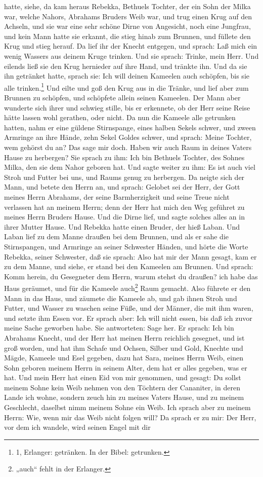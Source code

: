 hatte, siehe, da kam heraus Rebekka, Bethuels Tochter, der ein Sohn der Milka war, welche Nahors, Abrahams Bruders Weib war, und trug einen Krug auf den Achseln, und sie war eine sehr schöne Dirne von Angesicht, noch eine Jungfrau, und kein Mann hatte sie erkannt, die stieg hinab zum Brunnen, und füllete den Krug und stieg herauf. Da lief ihr der Knecht entgegen, und sprach: Laß mich ein wenig Wassers aus deinem Kruge trinken. Und sie sprach: Trinke, mein Herr. Und eilends ließ sie den Krug hernieder auf ihre Hand, und tränkte ihn. Und da sie ihn getränket hatte, sprach sie: Ich will deinen Kameelen auch schöpfen, bis sie alle trinken.\footnote{1, Erlanger: getränken. In der Bibel: getrunken.} Und eilte und goß den Krug aus in die Tränke, und lief aber zum Brunnen zu schöpfen, und schöpfete allein seinen Kameelen. Der Mann aber wunderte sich ihrer und schwieg stille, bis er erkennete, ob der Herr seine Reise hätte lassen wohl gerathen, oder nicht. Da nun die Kameele alle getrunken hatten, nahm er eine güldene Stirnspange, eines halben Sekels schwer, und zween Armringe an ihre Hände, zehn Sekel Goldes schwer, und sprach: Meine Tochter, wem gehörst du an? Das sage mir doch. Haben wir auch Raum in deines Vaters Hause zu herbergen? Sie sprach zu ihm: Ich bin Bethuels Tochter, des Sohnes Milka, den sie dem Nahor geboren hat. Und sagte weiter zu ihm: Es ist auch viel Stroh und Futter bei uns, und Raums genug zu herbergen. Da neigte sich der Mann, und betete den Herrn an, und sprach: Gelobet sei der Herr, der Gott meines Herrn Abrahams, der seine Barmherzigkeit und seine Treue nicht verlassen hat an meinem Herrn; denn der Herr hat mich den Weg geführet zu meines Herrn Bruders Hause. Und die Dirne lief, und sagte solches alles an in ihrer Mutter Hause. Und Rebekka hatte einen Bruder, der hieß Laban. Und Laban lief zu dem Manne draußen bei dem Brunnen, und als er sahe die Stirnspangen, und Armringe an seiner Schwester Händen, und hörte die Worte Rebekka, seiner Schwester, daß sie sprach: Also hat mir der Mann gesagt, kam er zu dem Manne, und siehe, er stand bei den Kameelen am Brunnen. Und sprach: Komm herein, du Gesegneter dem Herrn, warum stehst du draußen? ich habe das Haus geräumet, und für die Kameele auch\footnote{„auch“ fehlt in der Erlanger.} Raum gemacht. Also führete er den Mann in das Haus, und zäumete die Kameele ab, und gab ihnen Stroh und Futter, und Wasser zu waschen seine Füße, und der Männer, die mit ihm waren, und setzte ihm Essen vor. Er sprach aber: Ich will nicht essen, bis daß ich zuvor meine Sache geworben habe. Sie antworteten: Sage her. Er sprach: Ich bin Abrahams Knecht, und der Herr hat meinen Herrn reichlich gesegnet, und ist groß worden, und hat ihm Schafe und Ochsen, Silber und Gold, Knechte und Mägde, Kameele und Esel gegeben, dazu hat Sara, meines Herrn Weib, einen Sohn geboren meinem Herrn in seinem Alter, dem hat er alles gegeben, was er hat. Und mein Herr hat einen Eid von mir genommen, und gesagt: Du sollst meinem Sohne kein Weib nehmen von den Töchtern der Cananiter, in deren Lande ich wohne, sondern zeuch hin zu meines Vaters Hause, und zu meinem Geschlecht, daselbst nimm meinem Sohne ein Weib. Ich sprach aber zu meinem Herrn: Wie, wenn mir das Weib nicht folgen will? Da sprach er zu mir: Der Herr, vor dem ich wandele, wird seinen Engel mit dir 
